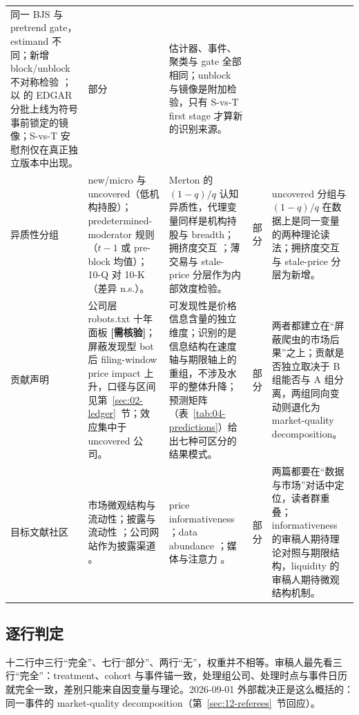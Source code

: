 \documentclass[a4paper,11pt]{ctexart}
\begin{document}
\begin{longtable}{@{}>{\raggedright\arraybackslash}p{1.8cm}>{\raggedright\arraybackslash}p{3.5cm}>{\raggedright\arraybackslash}p{3.5cm}>{\centering\arraybackslash}p{1.1cm}>{\raggedright\arraybackslash}p{3.7cm}@{}}
同一 BJS 与 pretrend gate，estimand 不同；新增 block/unblock 不对称检验 \citep{chennoronhasingal2004}；以 \citet{gaohuang2020} 的 EDGAR 分批上线为符号事前锁定的镜像；S-vs-T 安慰剂仅在真正独立版本中出现。 &
部分 &
估计器、事件、聚类与 gate 全部相同；unblock 与镜像是附加检验，只有 S-vs-T first stage 才算新的识别来源。 \\
\addlinespace
异质性分组 &
new/micro 与 uncovered（低机构持股）；predetermined-moderator 规则（$t-1$ 或 pre-block 均值）；10-Q 对 10-K（差异 n.s.）。 &
Merton 的 $(1-q)/q$ 认知异质性，代理变量同样是机构持股与 breadth；拥挤度交互 \citep{hirshleiferlimteoh2009}；薄交易与 stale-price 分层作为内部效度检验。 &
部分 &
uncovered 分组与 $(1-q)/q$ 在数据上是同一变量的两种理论读法；拥挤度交互与 stale-price 分层为新增。 \\
\addlinespace
贡献声明 &
公司层 robots.txt 十年面板 \textbf{[需核验]}；屏蔽发现型 bot 后 filing-window price impact 上升，口径与区间见第~\ref{sec:02-ledger}~节；效应集中于 uncovered 公司。 &
可发现性是价格信息含量的独立维度；识别的是信息结构在速度轴与期限轴上的重组，不涉及水平的整体升降；预测矩阵（表~\ref{tab:04-predictions}）给出七种可区分的结果模式。 &
部分 &
两者都建立在“屏蔽爬虫的市场后果”之上；贡献是否独立取决于 B 组能否与 A 组分离，两组同向变动则退化为 market-quality decomposition。 \\
\addlinespace
目标文献社区 &
市场微观结构与流动性；披露与流动性 \citep{diamondverrecchia1991,balakrishnanetal2014}；公司网站作为披露渠道 \citep{boullandbourveaubreuer2026}。 &
price informativeness \citep{baiphilipponsavov2016,davilaparlatore2026,farboodietal2022}；data abundance \citep{dugastfoucault2018,dugastfoucault2025,goldsteinspattye2021}；媒体与注意力 \citep{engelbergparsons2011,peress2014}。 &
部分 &
两篇都要在“数据与市场”对话中定位，读者群重叠；informativeness 的审稿人期待理论对照与期限结构，liquidity 的审稿人期待微观结构机制。 \\
\end{longtable}

\subsection{逐行判定}\label{sec:10-rowwise}

十二行中三行“完全”、七行“部分”、两行“无”，权重并不相等。审稿人最先看三行“完全”：treatment、cohort 与事件锚一致，处理组公司、处理时点与事件日历就完全一致，差别只能来自因变量与理论。2026-09-01 外部裁决正是这么概括的：同一事件的 market-quality decomposition（第~\ref{sec:12-referees}~节回应）。
\end{document}

